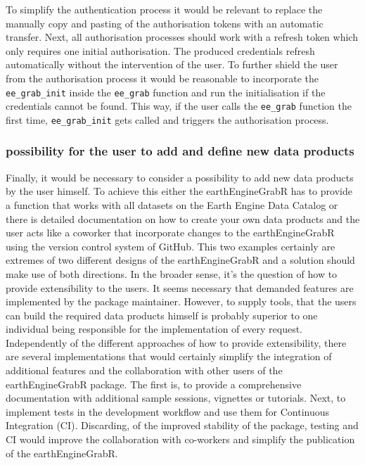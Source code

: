 \documentclass[11pt,twoside,a4paper,final]{report}
\begin{document}
To simplify the authentication process it would be relevant to replace the manually copy and pasting of the authorisation tokens with an automatic transfer. Next, all authorisation processes should work with a refresh token which only requires one initial authorisation. The produced credentials refresh automatically without the intervention of the user. To further shield the user from the authorisation process it would be reasonable to incorporate the \texttt{ee\_grab\_init} inside the \texttt{ee\_grab} function and run the initialisation if the credentials cannot be found. This way, if the user calls the \texttt{ee\_grab} function the first time, \texttt{ee\_grab\_init} gets called and triggers the authorisation process. 


\subsubsection{possibility for the user to add and define new data products}


Finally, it would be necessary to consider a possibility to add new data products by the user himself. To achieve this either the earthEngineGrabR has to provide a function that works with all datasets on the Earth Engine Data Catalog or there is detailed documentation on how to create your own data products and the user acts like a coworker that incorporate changes to the earthEngineGrabR using the version control system of GitHub. This two examples certainly are extremes of two different designs of the earthEngineGrabR and a solution should make use of both directions. In the broader sense, it's the question of how to provide extensibility to the users. It seems necessary that demanded features are implemented by the package maintainer. However, to supply tools, that the users can build the required data products himself is probably superior to one individual being responsible for the implementation of every request.
Independently of the different approaches of how to provide extensibility, there are several implementations that would certainly simplify the integration of additional features and the collaboration with other users of the earthEngineGrabR package. The first is, to provide a comprehensive documentation with additional sample sessions, vignettes or tutorials. Next, to implement tests in the development workflow and use them for Continuous Integration (CI). Discarding, of the improved stability of the package, testing and CI would improve the collaboration with co-workers and simplify the publication of the earthEngineGrabR. 
\end{document}
